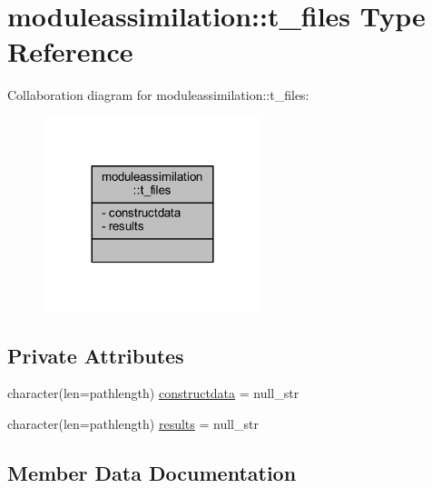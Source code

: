 \hypertarget{structmoduleassimilation_1_1t__files}{}\section{moduleassimilation\+:\+:t\+\_\+files Type Reference}
\label{structmoduleassimilation_1_1t__files}


Collaboration diagram for moduleassimilation\+:\+:t\+\_\+files\+:\nopagebreak
\begin{figure}[H]
\begin{center}
\leavevmode
\includegraphics[width=180pt]{structmoduleassimilation_1_1t__files__coll__graph}
\end{center}
\end{figure}
\subsection*{Private Attributes}
\begin{DoxyCompactItemize}
\item 
character(len=pathlength) \mbox{\hyperlink{structmoduleassimilation_1_1t__files_ac84850f4e38826c03e7110ade4a99b3e}{constructdata}} = null\+\_\+str
\item 
character(len=pathlength) \mbox{\hyperlink{structmoduleassimilation_1_1t__files_ac4ce8d183913f4c337e557d90e079f83}{results}} = null\+\_\+str
\end{DoxyCompactItemize}


\subsection{Member Data Documentation}
\mbox{\label{structmoduleassimilation_1_1t__files_ac84850f4e38826c03e7110ade4a99b3e}} 
